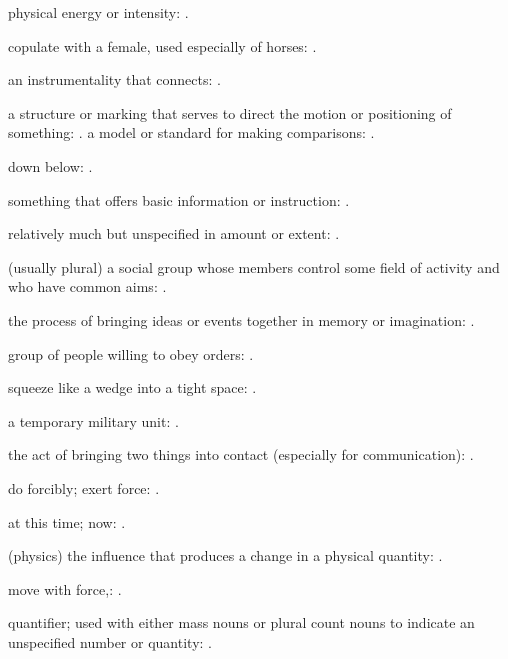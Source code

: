   physical energy or intensity:   .

  copulate with a female, used especially of horses:   .

  an instrumentality that connects:   .

  a structure or marking that serves to direct the motion or positioning of something: . a model or standard for making comparisons:   .

  down below: .

  something that offers basic information or instruction:   .

  relatively much but unspecified in amount or extent: .

  (usually plural) a social group whose members control some field of activity and who have common aims:   .

  the process of bringing ideas or events together in memory or imagination:   .

  group of people willing to obey orders:   .

  squeeze like a wedge into a tight space:   .

  a temporary military unit:   .

  the act of bringing two things into contact (especially for communication):   .

  do forcibly; exert force: .

  at this time; now: .

  (physics) the influence that produces a change in a physical quantity: .

  move with force,:   .

  quantifier; used with either mass nouns or plural count nouns to indicate an unspecified number or quantity: .

